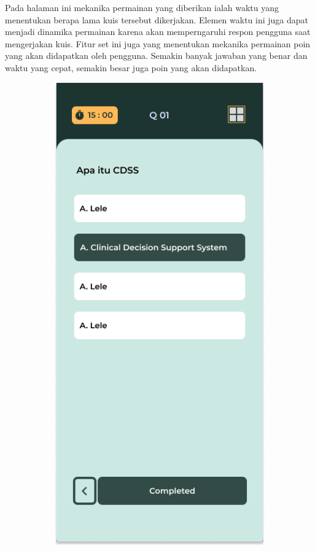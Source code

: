 Pada halaman ini mekanika permainan yang diberikan ialah waktu yang menentukan berapa lama kuis tersebut dikerjakan.
Elemen waktu ini juga dapat menjadi dinamika permainan karena akan memperngaruhi respon pengguna saat mengerjakan kuis.
Fitur set ini juga yang menentukan mekanika permainan poin yang akan didapatkan oleh pengguna. Semakin banyak jawaban yang benar dan waktu yang cepat, semakin besar juga poin yang akan didapatkan.
\begin{figure}[H]
	\centering
	\begin{subfigure}[b]{0.23\textwidth}
		\centering
	  \includegraphics[width=\linewidth]{contents/chapter-3/images/HF-kuis1-dt.png}

\end{subfigure}
\end{figure}
